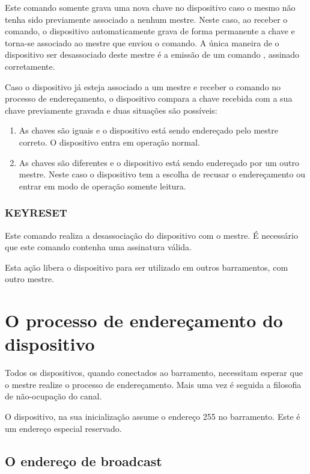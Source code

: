 \documentclass[11pt]{report}
\begin{document}
Este comando somente grava uma nova chave no dispositivo caso o mesmo não tenha sido previamente associado a nenhum mestre. Neste caso, ao receber o comando, o dispositivo automaticamente grava de forma permanente a chave e torna-se associado ao mestre que enviou o comando. A única maneira de o dispositivo ser desassociado deste mestre é a emissão de um comando , assinado corretamente.

Caso o dispositivo já esteja associado a um mestre e receber o comando  no processo de endereçamento, o dispositivo compara a chave recebida com a sua chave previamente gravada e duas situações são possíveis:

\begin{enumerate}

\item As chaves são iguais e o dispositivo está sendo endereçado pelo mestre correto. O dispositivo entra em operação normal.

\item As chaves são diferentes e o dispositivo está sendo endereçado por um outro mestre. Neste caso o dispositivo tem a escolha de recusar o endereçamento ou entrar em modo de operação somente leitura.

\end{enumerate}

\subsubsection{KEYRESET}

Este comando realiza a desassociação do dispositivo com o mestre. É necessário que este comando contenha uma assinatura válida.

Esta ação libera o dispositivo para ser utilizado em outros barramentos, com outro mestre.

\section{O processo de endereçamento do dispositivo}

Todos os dispositivos, quando conectados ao barramento, necessitam esperar que o mestre realize o processo de endereçamento. Mais uma vez é seguida a filosofia de não-ocupação do canal.

O dispositivo, na sua inicialização assume o endereço 255 no barramento. Este é um endereço especial reservado.

\subsection{O endereço de broadcast}
\end{document}
